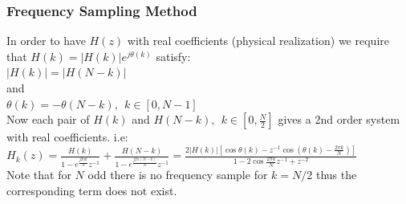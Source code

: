 \documentclass[mathserif, 10pt]{beamer} %
\begin{document}
\frame
{

\small
\frametitle{Frequency Sampling Method}

In order to have $H(z)$ with real coefficients (physical realization) we require that $H(k)=|H(k)| e^{j\theta(k)}$ satisfy:\\ \vspace{.15in}
$|H(k)| = |H(N-k)|$ \\
and \\
$\theta(k) = -\theta(N-k), ~~k\in[0,N-1]$\\ \vspace{.1in}
Now each pair of $ H(k)$ and $H(N-k),~~k\in[0,\frac{N}{2}]$ gives a 2nd order system with real coefficients.  i.e:
$H_k(z) = \frac{H(k)}{1-e^\frac{j2\pi k}{N}z^{-1}}+\frac{H(N-k)}{1-e^\frac{j2\pi (N-k)}{N}z^{-1}} = \frac{2|H(k)|[\cos{\theta(k)} -z^{-1} \cos{(\theta(k)-\frac{2\pi k}{N})}]}{1-2 \cos\frac{2\pi k}{N}z^{-1}+z^{-2}}$  \\ \vspace{.1in}
Note that for $N$ odd there is no frequency sample for $k=N/2$ thus the corresponding term does not exist.

}
\end{document}
